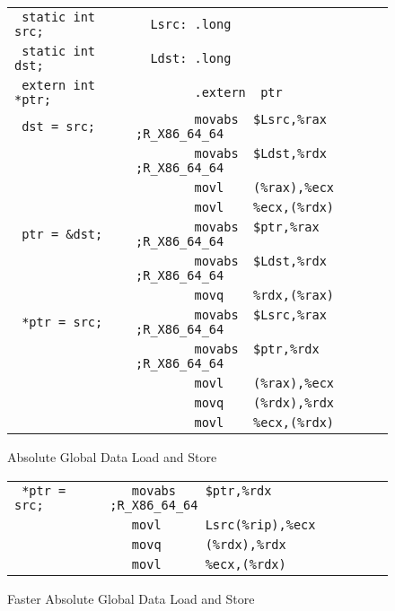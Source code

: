 \begin{figure}[H]
\Hrule
\caption{Absolute Global Data Load and Store}\label{large_abs_data_load_store}
\begin{center}
\begin{footnotesize}
\begin{tabular}{|l|l|}
\hline
\verb# static int src;  # & \verb#  Lsrc: .long                # \\
\verb# static int dst;  # & \verb#  Ldst: .long                # \\
\verb# extern int *ptr; # & \verb#        .extern  ptr         # \\
\hline
\verb# dst = src;       # & \verb#        movabs  $Lsrc,%rax   ;R_X86_64_64 # \\
\verb#                  # & \verb#        movabs  $Ldst,%rdx   ;R_X86_64_64 # \\
\verb#                  # & \verb#        movl    (%rax),%ecx  # \\
\verb#                  # & \verb#        movl    %ecx,(%rdx)  # \\
\hline
\verb# ptr = &dst;      # & \verb#        movabs  $ptr,%rax    ;R_X86_64_64 # \\
\verb#                  # & \verb#        movabs  $Ldst,%rdx   ;R_X86_64_64 # \\
\verb#                  # & \verb#        movq    %rdx,(%rax)  # \\
\hline
\verb# *ptr = src;      # & \verb#        movabs  $Lsrc,%rax   ;R_X86_64_64 # \\
\verb#                  # & \verb#        movabs  $ptr,%rdx    ;R_X86_64_64 # \\
\verb#                  # & \verb#        movl    (%rax),%ecx  # \\
\verb#                  # & \verb#        movq    (%rdx),%rdx  # \\ 
\verb#                  # & \verb#        movl    %ecx,(%rdx)  # \\
\hline
\end{tabular}
\end{footnotesize}
\end{center}
\end{figure}
            
\begin{figure}[H]
\Hrule
\caption{Faster Absolute Global Data Load and Store}
\label{large_rip_rel_addr_abs}
\begin{center}
\begin{footnotesize}
\begin{tabular}{|l|l|}
\hline
\verb# *ptr = src; # & \verb#   movabs    $ptr,%rdx        ;R_X86_64_64 # \\
\verb#             # & \verb#   movl      Lsrc(%rip),%ecx  # \\
\verb#             # & \verb#   movq      (%rdx),%rdx      # \\
\verb#             # & \verb#   movl      %ecx,(%rdx)      # \\
\hline
\end{tabular} %
\end{footnotesize}
\end{center}
\end{figure}

